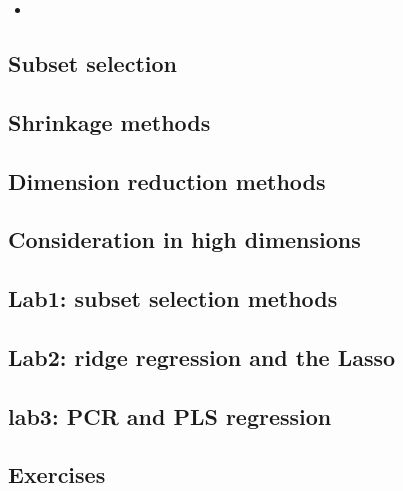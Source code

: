\begin{itemize}
	\item
 \end{itemize}
\subsection{Subset selection}

\subsection{Shrinkage methods}

\subsection{Dimension reduction methods}

\subsection{Consideration in high dimensions}

\subsection{Lab1: subset selection methods}

\subsection{Lab2: ridge regression and the Lasso}

\subsection{lab3: PCR and PLS regression}

\subsection{Exercises}

